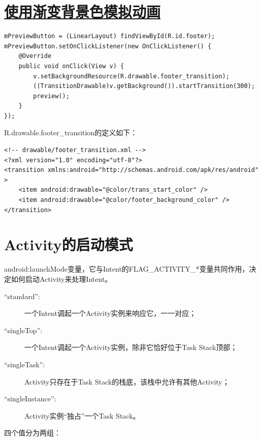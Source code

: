 ﻿\documentclass[a4paper,11pt]{article}
\begin{document}
  \section[使用渐变背景色模拟动画]{\underline{使用渐变背景色模拟动画}}
  \begin{verbatim}
mPreviewButton = (LinearLayout) findViewById(R.id.footer);
mPreviewButton.setOnClickListener(new OnClickListener() {
    @Override
    public void onClick(View v) {
        v.setBackgroundResource(R.drawable.footer_transition);
        ((TransitionDrawable)v.getBackground()).startTransition(300);
        preview();
    }
});
  \end{verbatim}

  R.drawable.footer\_transition的定义如下：

  \begin{verbatim}
<!-- drawable/footer_transition.xml -->
<?xml version="1.0" encoding="utf-8"?>
<transition xmlns:android="http://schemas.android.com/apk/res/android" >
    <item android:drawable="@color/trans_start_color" />
    <item android:drawable="@color/footer_background_color" />
</transition>
  \end{verbatim}


  \section[Activity的启动模式]{Activity的启动模式}
  android:launchMode变量，它与Intent的FLAG\_ACTIVITY\_*变量共同作用，决定如何启动Activity来处理Intent。

  \begin{description}
    \item[``standard'':] 一个Intent调起一个Activity实例来响应它，一一对应；
    \item[``singleTop'':] 一个Intent调起一个Activity实例，除非它恰好位于Task Stack顶部；
    \item[``singleTask'':] Activity只存在于Task Stack的栈底，该栈中允许有其他Activity；
    \item[``singleInstance'':] Activity实例“独占”一个Task Stack。
  \end{description}

  四个值分为两组：
\end{document}
